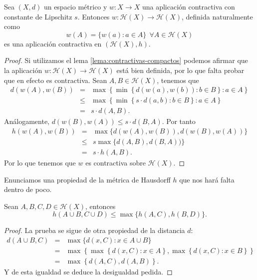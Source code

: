 \begin{lema}
    Sea $(X,d)$ un espacio métrico y $w:X\longrightarrow X$ una aplicación contractiva con constante de Lipschitz $s$. Entonces $w:\mathcal{H}(X)\longrightarrow\mathcal{H}(X)$, definida naturalmente como
    $$
    w(A)=\{w(a):a\in A\}\ \ \forall A\in\mathcal{H}(X)
    $$
    es una aplicación contractiva en $(\mathcal{H}(X),h)$.
\end{lema}
\begin{proof}
    Si utilizamos el lema \ref{lema:contractivas-compactos} podemos afirmar que la aplicación $w:\mathcal{H}(X)\longrightarrow\mathcal{H}(X)$ está bien definida, por lo que falta probar que en efecto es contractiva. Sean $A,B\in\mathcal{H}(X)$, tenemos que
    \begin{eqnarray*}
        d(w(A),w(B)) & = & \max\left\lbrace \min \left\lbrace d(w(a),w(b)): b\in B\right\rbrace : a\in A \right\rbrace \\
                     & \leq &  \max\left\lbrace \min \left\lbrace s\cdot d(a,b): b\in B\right\rbrace : a\in A \right\rbrace \\
                     & = & s\cdot d(A,B).
    \end{eqnarray*}
    Análogamente, $d(w(B),w(A))\leq s\cdot d(B,A)$. Por tanto
    \begin{eqnarray*}
        h(w(A),w(B)) & = & \max \{d(w(A),w(B)), d(w(B),w(A))\} \\
                     & \leq & s \max \{d(A,B), d(B,A))\} \\
                     & = & s\cdot h(A,B).
    \end{eqnarray*}
    Por lo que tenemos que $w$ es contractiva sobre $\mathcal{H}(X)$.
\end{proof}

Enunciamos una propiedad de la métrica de Hausdorff $h$ que nos hará falta dentro de poco.

\begin{lema}
    \label{lema:uniones}
    Sean $A,B,C,D\in\mathcal{H}(X)$, entonces 
    $$h(A\cup B, C\cup D)\leq\max\{h(A,C),h(B,D)\}.$$
\end{lema}
\begin{proof}
    La prueba se sigue de otra propiedad de la distancia $d$:
    \begin{eqnarray*}
    d(A\cup B,C) & = & \max\{d(x,C) : x\in A\cup B\} \\
                 & = & \max\left\lbrace \max\left\lbrace d(x,C):x\in A \right\rbrace, \max\left\lbrace d(x,C):x\in B \right\rbrace\right\rbrace \\
                 & = & \max\left\lbrace d(A,C),d(A,B) \right\rbrace.
    \end{eqnarray*}
    Y de esta igualdad se deduce la desigualdad pedida. %
\end{proof}

